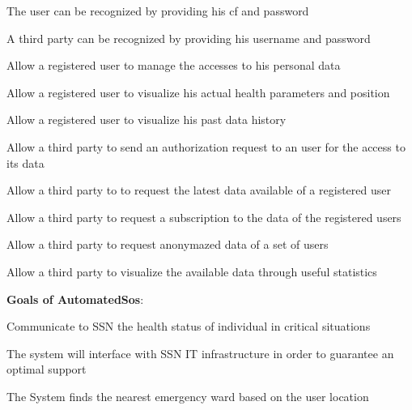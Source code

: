 \begin{goalList}
\begin{enumerate}[label={[}G 1.\arabic*{]}]
\item \label{goal:user0}The user can be recognized by providing his cf and password
\item \label{goal:user00}A third party can be recognized by providing his username and password

    \item \label{goal:user1} Allow a registered user to manage the accesses to his personal data
    \item \label{goal:user2}Allow a registered user to visualize his actual health parameters and position
    \item \label{goal:user3}Allow a registered user to visualize his past data history
    
     \item \label{goal:parties1}Allow a third party to send an authorization request to an user for the access to its data
     \item \label{goal:parties2}Allow a third party to to request the latest data available of a registered user
 
    \item \label{goal:parties3}Allow a third party to request a subscription to the data of the registered users
    
    \item \label{goal:parties4}Allow a third party to request anonymazed data of a set of users 
    
    \item \label{goal:parties5}Allow a third party to visualize the available data through useful statistics 


\end{enumerate}
\textbf{Goals of AutomatedSos}:
\begin{enumerate}[label={[}G 2.\arabic*{]}]

\item \label{goal:sos1}Communicate to SSN the health status of individual in critical situations
\item \label{goal:sos2}
The system will interface with SSN IT infrastructure in order to guarantee an optimal support
\item \label{goal:sos3}The System finds the nearest emergency ward based on the user location

\end{enumerate}
\newpage


\end{goalList}
